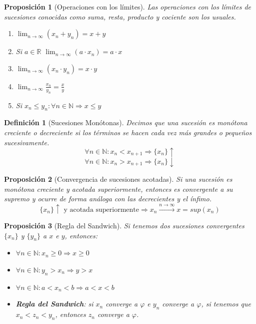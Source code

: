 \documentclass[10pt,a4paper,openright]{book}
\newtheorem{proposicion}{Proposición}[chapter]
\newtheorem{definicion}{Definición}[chapter]
\begin{document}
\begin{proposicion}[Operaciones con los límites]
Las operaciones con los límites de sucesiones conocidas como suma, resta, producto y cociente son los usuales.
\begin{enumerate}
\item $\lim_{n\rightarrow \infty}(x_n+y_n)=x+y$

\item Si $a\in \mathbb R$ $\lim_{n\rightarrow \infty} (a\cdot x_n)=a\cdot x$

\item $\lim_{n\rightarrow \infty}(x_n\cdot y_n)=x\cdot y$

\item $\lim_{n\rightarrow \infty}\frac{x_n}{y_n}=\frac{x}{y}$

\item Si $x_n\leq y_n: \forall n\in \mathbb N\Rightarrow x\leq y$
\end{enumerate}
\end{proposicion}

\begin{definicion}[Sucesiones Monótonas]
Decimos que una sucesión es monótona creciente o decreciente si los términos se hacen cada vez más grandes o pequeños sucesivamente.
$$\forall n\in \mathbb N: x_n<x_{n+1}\Rightarrow \{x_n\} \uparrow$$
$$\forall n\in \mathbb N: x_n>x_{n+1}\Rightarrow \{x_n\} \downarrow$$
\end{definicion}

\begin{proposicion}[Convergencia de sucesiones acotadas]
Si una sucesión es monótona creciente y acotada superiormente, entonces es convergente a su supremo y ocurre de forma análoga con las decrecientes y el ínfimo.
$$\{x_n\} \uparrow \mbox{ y  acotada superiormente}\Rightarrow  x_n \xrightarrow{n \rightarrow \infty} x=sup(x_n)$$
\end{proposicion}

\begin{proposicion}[Regla del Sandwich]
Si tenemos dos sucesiones convergentes $\{x_n\}$ y $\{y_n\}$ a $x$ e $y$, entonces:
\begin{itemize}
\item $\forall n\in \mathbb N: x_n\geq 0\Rightarrow x\geq 0$
\item $\forall n\in \mathbb N: y_n > x_n\Rightarrow y>x$
\item $\forall n\in \mathbb N: a<x_n<b\Rightarrow a<x<b$
\item \textbf{Regla del Sandwich}: si $x_n$ converge a $\varphi$ e $y_n$ converge a $\varphi$, si tenemos que $x_n< z_n < y_n$, entonces $z_n$ converge a $\varphi$.
\end{itemize}
\end{proposicion}
\end{document}
